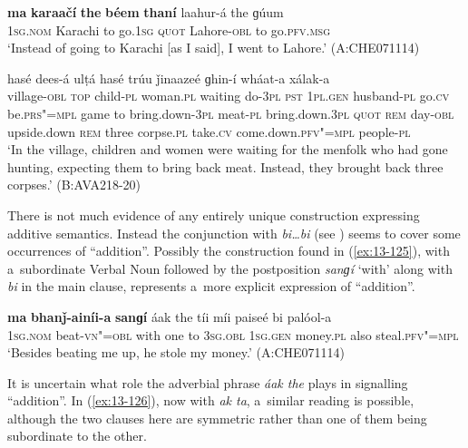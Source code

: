 \begin{exe}
\ex
\label{ex:13-123}
\gll \textbf{ma} \textbf{karaačí} \textbf{the} \textbf{béem} \textbf{thaní} laahur-á the  ɡúum \\
\textsc{1sg.nom} Karachi to go.\textsc{1sg} \textsc{quot} Lahore-\textsc{obl} to go.\textsc{pfv.msg} \\
\glt `Instead of going to Karachi [as I said], I went to Lahore.' (A:CHE071114)

\ex
\label{ex:13-124}
 hasé	dees-á ulṭá hasé trúu ǰinaazeé ɡhin-í wháat-a xálak-a \\
village-\textsc{obl} \textsc{top} child-\textsc{pl} woman.\textsc{pl} waiting do-\textsc{3pl}
\textsc{pst} \textsc{1pl.gen} husband-\textsc{pl} go.\textsc{cv} be.\textsc{prs"=mpl} game to
bring.down-\textsc{3pl} meat-\textsc{pl} bring.down.\textsc{3pl} \textsc{quot}  \textsc{rem} day-\textsc{obl} upside.down \textsc{rem} three corpse.\textsc{pl} take.\textsc{cv} come.down.\textsc{pfv"=mpl} people-\textsc{pl} \\
\glt `In the village, children and women were waiting for the menfolk who had gone hunting, expecting them to bring back meat. Instead, they brought back three corpses.' (B:AVA218-20) 
\end{exe}

 There is not much evidence of any entirely unique construction expressing additive semantics. Instead the conjunction with \textit{bi{\ldots}bi} (see ) seems to cover some occurrences of ``addition''. Possibly the construction found in (\ref{ex:13-125}), with a~subordinate Verbal Noun followed by the postposition \textit{sanɡí} `with' along with \textit{bi} in the main clause, represents a~more explicit expression of ``addition''. 

\begin{exe}
\ex
\label{ex:13-125}
\gll \textbf{ma} \textbf{bhanǰ-ainíi-a} \textbf{sanɡí} áak the tíi míi  paiseé bi palóol-a \\
\textsc{1sg.nom} beat-\textsc{vn"=obl} with one to \textsc{3sg.obl} \textsc{1sg.gen} money.\textsc{pl}  also steal.\textsc{pfv"=mpl} \\
\glt `Besides beating me up, he stole my money.' (A:CHE071114) 
\end{exe}

It is uncertain what role the adverbial phrase \textit{áak the} plays in signalling ``addition''. In (\ref{ex:13-126}), now with \textit{ak ta}, a~similar reading is possible, although the two clauses here are symmetric rather than one of them being subordinate to the other.

